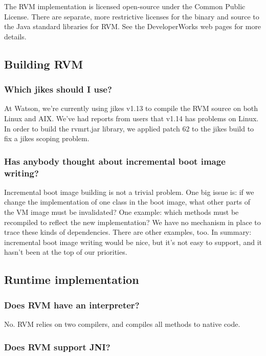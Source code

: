 The RVM implementation is licensed open-source under the Common Public
License.  There are separate, more restrictive licenses 
for the binary and 
source to the Java standard libraries for RVM.  See the DeveloperWorks
web pages for more details. 

\subsection{Building RVM}

\subsubsection{Which jikes should I use?}
At Watson, we're currently using jikes v1.13 to compile the RVM source on
both Linux and AIX.  We've had reports from users that v1.14 has problems
on Linux.  In order to build the rvmrt.jar library, we applied patch 62 to
the jikes build to fix a jikes scoping problem.


\subsubsection{Has anybody thought about incremental boot image writing?}

Incremental boot image building is not a trivial problem.  One big
issue is: if we change the implementation of one class in the boot image,
what other parts of the VM image must be invalidated?  One example: which
methods must be recompiled to reflect the new implementation?  We have no
mechanism in place to trace these kinds of dependencies.  There are other
examples, too.  In summary: incremental boot image writing would be nice,
but it's not easy to support, and it hasn't been at the top of our
priorities.

\subsection{Runtime implementation}

\subsubsection{Does RVM have an interpreter?}

No.  RVM relies on two compilers, and compiles all methods to native code.

\subsubsection{Does RVM support JNI?}

